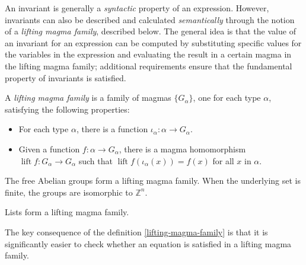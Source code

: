 An invariant is generally a \emph{syntactic} property of an expression. However, invariants can also be described and calculated \emph{semantically} through the notion of a \emph{lifting magma family}, described below. The general idea is that the value of an invariant for an expression can be computed by substituting specific values for the variables in the expression and evaluating the result in a certain magma in the lifting magma family; additional requirements ensure that the fundamental property of invariants is satisfied.

\begin{definition}\label{lifting-magma-family}
A \emph{lifting magma family} is a family of magmas $\{G_\alpha\}$, one for each type $\alpha$, satisfying the following properties:
\begin{itemize}
\item For each type $\alpha$, there is a function $\iota_\alpha : \alpha \to G_\alpha$.
\item Given a function $f : \alpha \to G_\alpha$, there is a magma homomorphism $\operatorname{lift}{f} : G_\alpha \to G_\alpha$ such that $\operatorname{lift}{f}(\iota_\alpha(x)) = f(x)$ for all $x$ in $\alpha$.
\end{itemize}
\end{definition}

\begin{example}
The free Abelian groups form a lifting magma family. When the underlying set is finite, the groups are isomorphic to $\mathbb{Z}^n$.
\end{example}

\begin{example}
Lists form a lifting magma family.
\end{example}

The key consequence of the definition \ref{lifting-magma-family} is that it is significantly easier to check whether an equation is satisfied in a lifting magma family.

